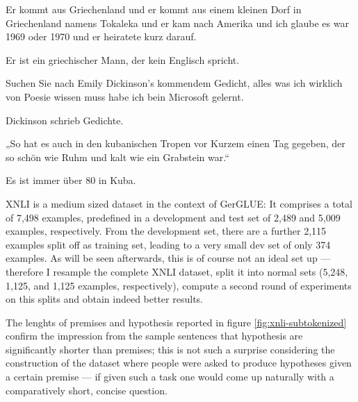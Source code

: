 \begin{examples}
  \item \label{itm:xnli1} Er kommt aus Griechenland und er kommt aus einem kleinen Dorf in Griechenland namens Tokaleka und er kam nach Amerika und ich glaube es war 1969 oder 1970 und er heiratete kurz darauf.

        Er ist ein griechischer Mann, der kein Englisch spricht.
  \item \label{itm:xnli2} Suchen Sie nach Emily Dickinson's kommendem Gedicht, alles was ich wirklich von Poesie wissen muss habe ich bein Microsoft gelernt.

        Dickinson schrieb Gedichte.
  \item \label{itm:xnli3} „So hat es auch in den kubanischen Tropen vor Kurzem einen Tag gegeben, der so schön wie Ruhm und kalt wie ein Grabstein war.“

        Es ist immer über 80 in Kuba.
\end{examples}


XNLI is a medium sized dataset in the context of GerGLUE: It comprises a total of 7,498 examples,
predefined in a development and test set of 2,489 and 5,009 examples, respectively. From the
development set, there are a further 2,115 examples split off as training set, leading to a very
small dev set of only 374 examples. As will be seen afterwards, this is of course not an ideal set
up --- therefore I resample the complete XNLI dataset, split it into normal sets (5,248, 1,125,
and 1,125 examples, respectively), compute a second round of experiments on this splits and
obtain indeed better results.

The lenghts of premises and hypothesis reported in figure \ref{fig:xnli-subtokenized} confirm the
impression from the sample sentences that hypothesis are significantly shorter than premises;
this is not such a surprise considering the construction of the dataset where people were asked
to produce hypotheses given a certain premise --- if given such a task one would come
up naturally with a comparatively short, concise question.



